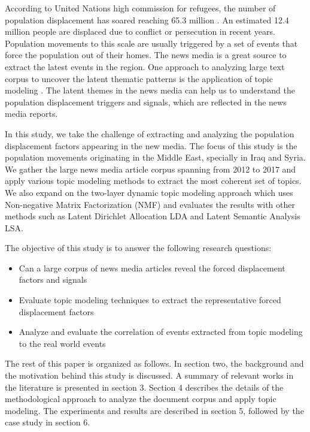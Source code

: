 According to United Nations high commission for refugees, the number of population displacement has soared reaching 65.3 million \cite{unrefugeeagency2016}. An estimated  12.4 million people are displaced due to conflict or persecution in recent years. Population movements to this scale are usually triggered by a set of events that force the population out of their homes. The news media is a great source to extract the latest events in the region. One approach to analyzing large text corpus to uncover the latent thematic patterns is the application of topic modeling \cite{Blei2003}. The latent themes in the news media can help us to understand the population displacement triggers and signals, which are reflected in the news media reports. 

In this study, we take the challenge of extracting and analyzing the population displacement factors appearing in the new media. The focus of this study is the population movements originating in the Middle East, specially in Iraq and Syria. We gather the large news media article corpus spanning from 2012 to 2017 and apply various topic modeling methods to extract the most coherent set of topics. We also expand on the two-layer dynamic topic modeling approach which uses Non-negative Matrix Factorization (NMF) \cite{Lee1999} and evaluates the results with other methods such as Latent Dirichlet Allocation LDA and Latent Semantic Analysis LSA. 

The objective of this study is to answer the following research questions:


\begin{itemize}
\item Can a large corpus of news media articles reveal the forced displacement factors and signals
\item Evaluate topic modeling techniques to extract the representative forced displacement factors
\item Analyze and evaluate the correlation of events extracted from topic modeling to the real world events
\end{itemize}

The rest of this paper is organized as follows. In section two, the background and the motivation behind this study is discussed. A summary of relevant works in the literature is presented in section 3. Section 4 describes the details of the methodological approach to analyze the document corpus and apply topic modeling. The experiments and results are described in section 5, followed by the case study in section 6. 

